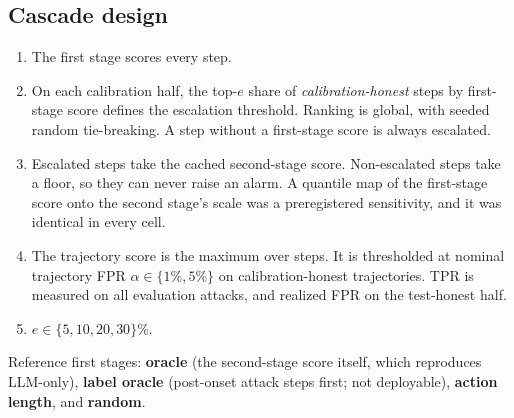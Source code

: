 \documentclass[11pt]{article}
\begin{document}
\subsection{Cascade design}
\begin{enumerate}
\item The first stage scores every step.
\item On each calibration half, the top-$e$ share of \emph{calibration-honest} steps by first-stage score defines the escalation threshold. Ranking is global, with seeded random tie-breaking. A step without a first-stage score is always escalated.
\item Escalated steps take the cached second-stage score. Non-escalated steps take a floor, so they can never raise an alarm. A quantile map of the first-stage score onto the second stage's scale was a preregistered sensitivity, and it was identical in every cell.
\item The trajectory score is the maximum over steps. It is thresholded at nominal trajectory FPR $\alpha\in\{1\%,5\%\}$ on calibration-honest trajectories. TPR is measured on all evaluation attacks, and realized FPR on the test-honest half.
\item $e\in\{5,10,20,30\}\%$.
\end{enumerate}
Reference first stages: \textbf{oracle} (the second-stage score itself, which reproduces LLM-only), \textbf{label oracle} (post-onset attack steps first; not deployable), \textbf{action length}, and \textbf{random}.
\end{document}
